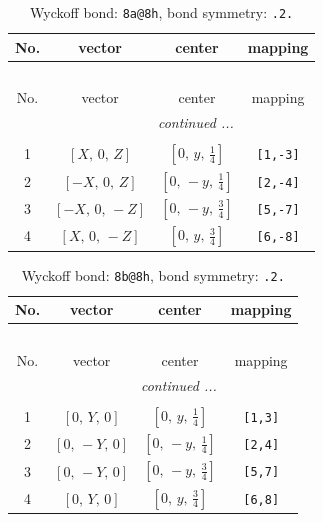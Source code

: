 \documentclass[fleqn,8pt]{jsarticle}
\begin{document}
\begin{longtable}{cccc}
\caption{Wyckoff bond: {\tt 8a@8h}, bond symmetry: {\tt .2.}}
 \\
 \hline \hline
No. & vector & center & mapping \\ \hline \endfirsthead

\multicolumn{3}{l}{\tablename\ \thetable{}} \\
 \hline \hline
No. & vector & center & mapping \\ \hline \endhead

 \hline \hline
\multicolumn{3}{r}{\footnotesize\it continued ...} \\ \endfoot

 \hline \hline
\multicolumn{3}{r}{} \\ \endlastfoot

1 & $\left[ X,\, 0,\, Z \right]$ & $\left[ 0,\, y,\, \frac{1}{4} \right]$ & {\tt [1,-3]} \\ \hline
2 & $\left[ - X,\, 0,\, Z \right]$ & $\left[ 0,\, - y,\, \frac{1}{4} \right]$ & {\tt [2,-4]} \\ \hline
3 & $\left[ - X,\, 0,\, - Z \right]$ & $\left[ 0,\, - y,\, \frac{3}{4} \right]$ & {\tt [5,-7]} \\ \hline
4 & $\left[ X,\, 0,\, - Z \right]$ & $\left[ 0,\, y,\, \frac{3}{4} \right]$ & {\tt [6,-8]} \\
\end{longtable}
\renewcommand{\arraystretch}{1.2}
\begin{longtable}{cccc}
\caption{Wyckoff bond: {\tt 8b@8h}, bond symmetry: {\tt .2.}}
 \\
 \hline \hline
No. & vector & center & mapping \\ \hline \endfirsthead

\multicolumn{3}{l}{\tablename\ \thetable{}} \\
 \hline \hline
No. & vector & center & mapping \\ \hline \endhead

 \hline \hline
\multicolumn{3}{r}{\footnotesize\it continued ...} \\ \endfoot

 \hline \hline
\multicolumn{3}{r}{} \\ \endlastfoot

1 & $\left[ 0,\, Y,\, 0 \right]$ & $\left[ 0,\, y,\, \frac{1}{4} \right]$ & {\tt [1,3]} \\ \hline
2 & $\left[ 0,\, - Y,\, 0 \right]$ & $\left[ 0,\, - y,\, \frac{1}{4} \right]$ & {\tt [2,4]} \\ \hline
3 & $\left[ 0,\, - Y,\, 0 \right]$ & $\left[ 0,\, - y,\, \frac{3}{4} \right]$ & {\tt [5,7]} \\ \hline
4 & $\left[ 0,\, Y,\, 0 \right]$ & $\left[ 0,\, y,\, \frac{3}{4} \right]$ & {\tt [6,8]} \\
\end{longtable}
\end{document}

